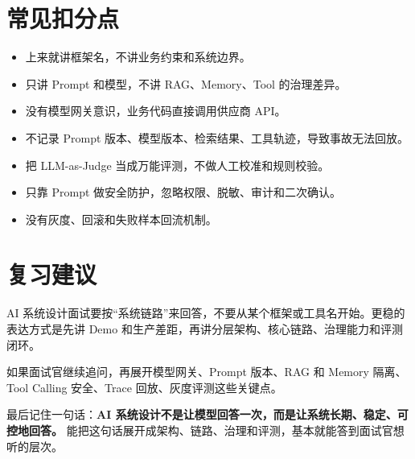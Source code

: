 \documentclass[9pt,a4paper,twocolumn]{ctexart}
\begin{document}
\section*{常见扣分点}

\begin{itemize}[itemsep=1pt, topsep=2pt]
  \item 上来就讲框架名，不讲业务约束和系统边界。
  \item 只讲 Prompt 和模型，不讲 RAG、Memory、Tool 的治理差异。
  \item 没有模型网关意识，业务代码直接调用供应商 API。
  \item 不记录 Prompt 版本、模型版本、检索结果、工具轨迹，导致事故无法回放。
  \item 把 LLM-as-Judge 当成万能评测，不做人工校准和规则校验。
  \item 只靠 Prompt 做安全防护，忽略权限、脱敏、审计和二次确认。
  \item 没有灰度、回滚和失败样本回流机制。
\end{itemize}


\section*{复习建议}


AI 系统设计面试要按“系统链路”来回答，不要从某个框架或工具名开始。更稳的表达方式是先讲 Demo 和生产差距，再讲分层架构、核心链路、治理能力和评测闭环。



如果面试官继续追问，再展开模型网关、Prompt 版本、RAG 和 Memory 隔离、Tool Calling 安全、Trace 回放、灰度评测这些关键点。



最后记住一句话：\textbf{AI 系统设计不是让模型回答一次，而是让系统长期、稳定、可控地回答。} 能把这句话展开成架构、链路、治理和评测，基本就能答到面试官想听的层次。
\end{document}

